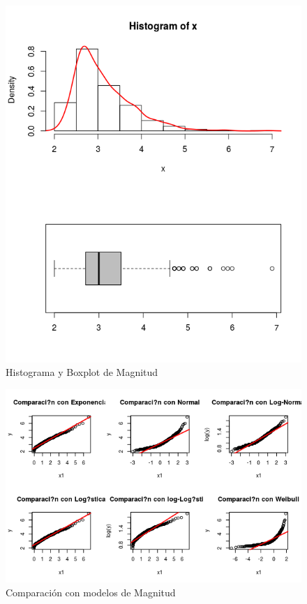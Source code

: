 \documentclass{article}
\begin{document}
\begin{enumerate}[a)]
\begin{figure}[h!]
\centering
\includegraphics[scale=0.5]{./figures/histplot_Magnitud.png}
\caption{Histograma y Boxplot de Magnitud}
\end{figure}

\begin{figure}[h!]
\centering
\includegraphics[scale=0.5]{./figures/cm_Magnitud.png}
\caption{Comparación con modelos de Magnitud}
\end{figure}


\end{enumerate}
\end{document}
